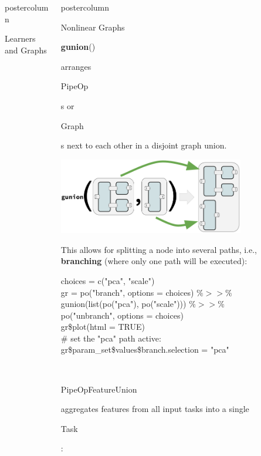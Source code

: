 \documentclass{beamer}
\newlength{\columnheight} %
\newcommand{\codeinline}[1]{\begin{codeboxinline}#1\end{codeboxinline}}
\begin{document}
\begin{frame}[fragile]{}
\begin{columns}
\begin{column}{.245\textwidth}
\begin{beamercolorbox}[center]{postercolumn}
\begin{minipage}{.98\textwidth}
{\begin{myblock}{Learners and Graphs}
            \end{myblock}
						\vfill}
				\end{minipage}
			\end{beamercolorbox}
		\end{column}
		\begin{column}{.245\textwidth}
			\begin{beamercolorbox}[center]{postercolumn}
				\begin{minipage}{.98\textwidth}
					\parbox[t][\columnheight]{\textwidth}{
            \begin{myblock}{Nonlinear Graphs}
              \codeinline{\textbf{gunion}()} arranges \codeinline{PipeOp}s or \codeinline{Graph}s next to each other in a disjoint graph union.
              \begin{center}
                \includegraphics[width=0.75\textwidth]{img/gunion.png}
              \end{center}
              This allows for splitting a node into several paths, i.e., \textbf{branching} (where only one path will be executed):
              \begin{codeboxexample}
						    {\footnotesize
                  choices = c("pca", "scale")\\
                  gr = po("branch", options = choices) $\%>>\%$\\
                  \hspace*{1ex} gunion(list(po("pca"), po("scale"))) $\%>>\%$\\
                  \hspace*{1ex} po("unbranch", options = choices)\\
                  gr\$plot(html = TRUE)\\
                  \# set the "pca" path active:\\
                  gr\$param\_set\$values\$branch.selection = "pca"}
					      \end{codeboxexample}
              \ \\
              \codeinline{PipeOpFeatureUnion} aggregates features from all input tasks into a single \codeinline{Task}:

\end{myblock}}
\end{minipage}
\end{beamercolorbox}
\end{column}
\end{columns}
\end{frame}
\end{document}

